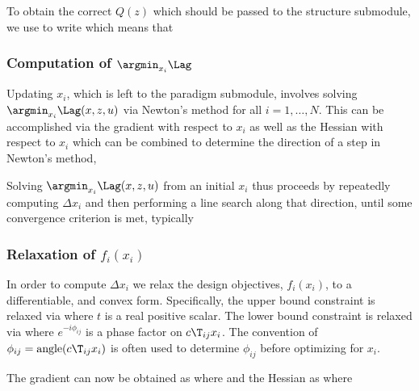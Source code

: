 \documentclass{book}
\begin{document}
To obtain the correct $Q(z)$ which should be passed to the structure submodule,
    we use  to write
    which means that

\subsubsection{Computation of $\argmin_{x_i} \Lag$}
Updating $x_i$, which is left to the paradigm submodule,
    involves solving $\argmin_{x_i} \Lag(x, z, u)$ via Newton's method for all $i = 1, \ldots, N$.
This can be accomplished via the gradient with respect to $x_i$
    as well as the Hessian with respect to $x_i$
    which can be combined to determine the direction of a step in Newton's method,

Solving $\argmin_{x_i} \Lag(x, z, u)$ from an initial $x_i$ thus proceeds by
    repeatedly computing $\Delta x_i$ and then performing a line search along that direction,
    until some convergence criterion is met, typically

\subsubsection{Relaxation of $f_i(x_i)$}
In order to compute $\Delta x_i$ we relax the design objectives, $f_i(x_i)$, to a differentiable, and convex form.
Specifically, the upper bound constraint is relaxed via
    where $t$ is a real positive scalar. The lower bound constraint is relaxed via
     where $e^{-i\phi_{ij}}$ is a phase factor on $c\T_{ij} x_i$.
The convention of $\phi_{ij} = \text{angle}(c\T_{ij} x_i)$ is often used
    to determine $\phi_{ij}$ before optimizing for $x_i$.

The gradient can now be obtained as
    where
    and the Hessian as 
    where
\end{document}
